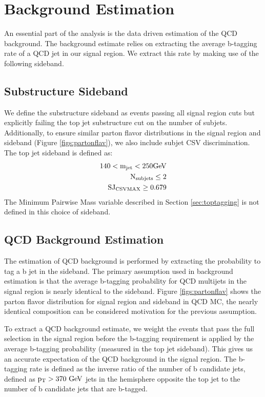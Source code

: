 \clearpage
\newpage
\chapter{Background Estimation}
\label{sec:backgroundEstimation}
An essential part of the analysis is the data driven estimation of the QCD background.  
The background estimate relies on extracting the average b-tagging rate of a QCD jet in our signal region.  
We extract this rate by making use of the following sideband.
\section{Substructure Sideband}
\label{sec:sideband}
We define the substructure sideband as events passing all signal region cuts but explicitly 
failing the top jet substructure cut on the number of subjets.  Additionally, to ensure similar parton flavor distributions in the signal region and sideband (Figure \ref{figs:partonflav}), 
we also include subjet CSV discrimination. The top jet sideband is defined as:
\begin{eqnarray}
	140  <  \mathrm{m_{jet}}  <  250 \mathrm{GeV} \\
	\mathrm{N_{subjets}}  \leq  2 \\
	\mathrm{SJ_{CSVMAX}} \geq 0.679 
\end{eqnarray}
The Minimum Pairwise Mass variable described in Section \ref{sec:toptagging} is not defined in this choice of sideband.

\section{QCD Background Estimation}
\label{sec:qcdBackgroundEstimationProcedure}
\label{sec:tagrateparameterization}
The estimation of QCD background is performed by extracting the probability to tag a b jet in the sideband. 
The primary assumption used in background estimation is that the average b-tagging probability 
for QCD multijets in the signal region is nearly identical to the sideband. Figure \ref{figs:partonflav}  shows the parton flavor distribution for signal region and sideband in QCD MC, the
 nearly identical composition can be considered motivation for the previous assumption.

To extract a QCD background estimate, we weight the events that pass the full selection in the signal region before the b-tagging requirement is applied by 
the average b-tagging probability (measured in the top jet sideband).  This gives us an accurate expectation of the QCD background in the signal region.
The b-tagging rate is defined as the inverse ratio of the number of b candidate jets, 
defined as $\mathrm{p_{T}} > 370~\mathrm{GeV}$ jets in the hemisphere opposite the top jet to the number of b candidate jets that are b-tagged.  


